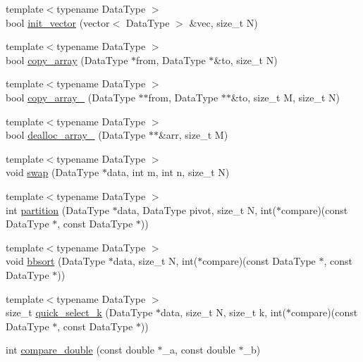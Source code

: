 \begin{DoxyCompactItemize}
{\footnotesize template$<$typename Data\-Type $>$ }\\bool \hyperlink{namespaceSimpleCluster_a28eb5aee7b654151728fe1333dc1a470}{init\-\_\-vector} (vector$<$ Data\-Type $>$ \&vec, size\-\_\-t N)
\item 
{\footnotesize template$<$typename Data\-Type $>$ }\\bool \hyperlink{namespaceSimpleCluster_a0639106c2ddf850801bd10f3ffb8de6f}{copy\-\_\-array} (Data\-Type $\ast$from, Data\-Type $\ast$\&to, size\-\_\-t N)
\item 
{\footnotesize template$<$typename Data\-Type $>$ }\\bool \hyperlink{namespaceSimpleCluster_a9bc5fb00d7a05159e5c7ba1b27e0273f}{copy\-\_\-array\-\_} (Data\-Type $\ast$$\ast$from, Data\-Type $\ast$$\ast$\&to, size\-\_\-t M, size\-\_\-t N)
\item 
{\footnotesize template$<$typename Data\-Type $>$ }\\bool \hyperlink{namespaceSimpleCluster_a22acb50e58f0867d2ee468f7f395f691}{dealloc\-\_\-array\-\_} (Data\-Type $\ast$$\ast$\&arr, size\-\_\-t M)
\item 
{\footnotesize template$<$typename Data\-Type $>$ }\\void \hyperlink{namespaceSimpleCluster_aefa29bb93b88e6235d7a7c3be4181bf7}{swap} (Data\-Type $\ast$data, int m, int n, size\-\_\-t N)
\item 
{\footnotesize template$<$typename Data\-Type $>$ }\\int \hyperlink{namespaceSimpleCluster_adcef86d645170d3c6b1c7908866d755e}{partition} (Data\-Type $\ast$data, Data\-Type pivot, size\-\_\-t N, int($\ast$compare)(const Data\-Type $\ast$, const Data\-Type $\ast$))
\item 
{\footnotesize template$<$typename Data\-Type $>$ }\\void \hyperlink{namespaceSimpleCluster_acbdd21892a0a82f32c6d1851a7044f37}{bbsort} (Data\-Type $\ast$data, size\-\_\-t N, int($\ast$compare)(const Data\-Type $\ast$, const Data\-Type $\ast$))
\item 
{\footnotesize template$<$typename Data\-Type $>$ }\\size\-\_\-t \hyperlink{namespaceSimpleCluster_a3ff7d10652b776ae35a941228850d904}{quick\-\_\-select\-\_\-k} (Data\-Type $\ast$data, size\-\_\-t N, size\-\_\-t k, int($\ast$compare)(const Data\-Type $\ast$, const Data\-Type $\ast$))
\item 
int \hyperlink{namespaceSimpleCluster_a14624e6cca7beb136be3623222fb3acc}{compare\-\_\-double} (const double $\ast$\-\_\-a, const double $\ast$\-\_\-b)
\end{DoxyCompactItemize}


